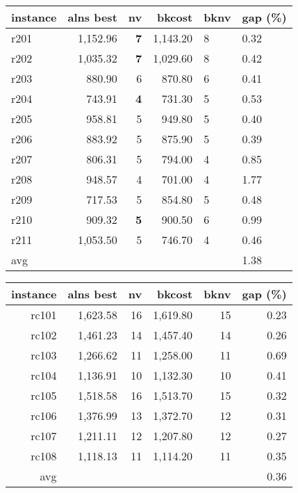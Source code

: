   \begin{table}[caption={Kết quả đo với tập Solomon R2}, label=exp:solomonR2, placement=h]
    \small
    \centering
    \begin{tabular}{lrrrll}
    \hline
    instance & alns best & nv & bkcost & bknv & gap (\%) \\ \hline
    r201 & 1,152.96 & \textbf{7} & 1,143.20 & 8 & 0.32 \\ \hline
    r202 & 1,035.32 & \textbf{7} & 1,029.60 & 8 & 0.42 \\ \hline
    r203 & 880.90 & 6 & 870.80 & 6 & 0.41 \\ \hline
    r204 & 743.91 & \textbf{4} & 731.30 & 5 & 0.53 \\ \hline
    r205 & 958.81 & 5 & 949.80 & 5 & 0.40 \\ \hline
    r206 & 883.92 & 5 & 875.90 & 5 & 0.39 \\ \hline
    r207 & 806.31 & 5 & 794.00 & 4 & 0.85 \\ \hline
    r208 & 948.57 & 4 & 701.00 & 4 & 1.77 \\ \hline
    r209 & 717.53 & 5 & 854.80 & 5 & 0.48 \\ \hline
    r210 & 909.32 & \textbf{5} & 900.50 & 6 & 0.99 \\ \hline
    r211 & 1,053.50 & 5 & 746.70 & 4 & 0.46 \\ \hline
    avg &  &  &  &  & 1.38 \\ \hline
    \end{tabular}
  \end{table}

  \begin{table}[caption={Kết quả đo với tập Solomon RC1}, label=exp:solomonRC1, placement=h]
    \small
    \centering
    \begin{tabular}{rrrrrr}
    \hline
    instance & alns best & nv & bkcost & bknv & gap (\%) \\ \hline
    rc101 & 1,623.58 & 16 & 1,619.80 & 15 & 0.23 \\ \hline
    rc102 & 1,461.23 & 14 & 1,457.40 & 14 & 0.26 \\ \hline
    rc103 & 1,266.62 & 11 & 1,258.00 & 11 & 0.69 \\ \hline
    rc104 & 1,136.91 & 10 & 1,132.30 & 10 & 0.41 \\ \hline
    rc105 & 1,518.58 & 16 & 1,513.70 & 15 & 0.32 \\ \hline
    rc106 & 1,376.99 & 13 & 1,372.70 & 12 & 0.31 \\ \hline
    rc107 & 1,211.11 & 12 & 1,207.80 & 12 & 0.27 \\ \hline
    rc108 & 1,118.13 & 11 & 1,114.20 & 11 & 0.35 \\ \hline
    avg &  &  &  &  & 0.36 \\ \hline
    \end{tabular}
  \end{table}

